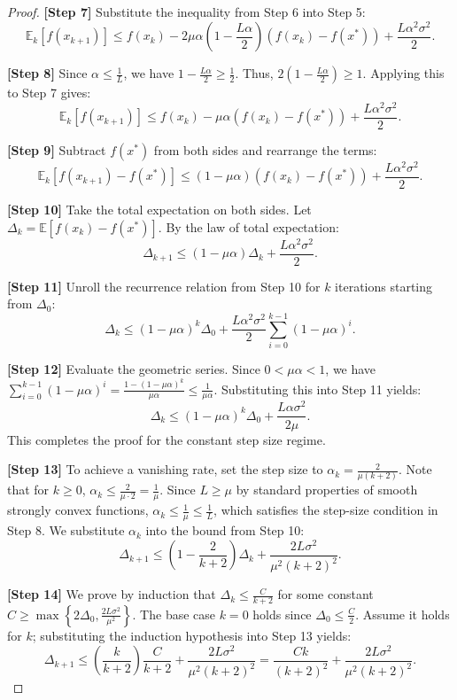 \documentclass[11pt]{article}
\begin{document}
\begin{proof}
\textbf{[Step 7]} Substitute the inequality from Step 6 into Step 5:
\[ \mathbb{E}_k[f(x_{k+1})] \le f(x_k) - 2 \mu \alpha \left( 1 - \frac{L \alpha}{2} \right) (f(x_k) - f(x^*)) + \frac{L \alpha^2 \sigma^2}{2}. \]

\textbf{[Step 8]} Since $\alpha \le \frac{1}{L}$, we have $1 - \frac{L \alpha}{2} \ge \frac{1}{2}$. Thus, $2 \left( 1 - \frac{L \alpha}{2} \right) \ge 1$. Applying this to Step 7 gives:
\[ \mathbb{E}_k[f(x_{k+1})] \le f(x_k) - \mu \alpha (f(x_k) - f(x^*)) + \frac{L \alpha^2 \sigma^2}{2}. \]

\textbf{[Step 9]} Subtract $f(x^*)$ from both sides and rearrange the terms:
\[ \mathbb{E}_k[f(x_{k+1}) - f(x^*)] \le (1 - \mu \alpha)(f(x_k) - f(x^*)) + \frac{L \alpha^2 \sigma^2}{2}. \]

\textbf{[Step 10]} Take the total expectation on both sides. Let $\Delta_k = \mathbb{E}[f(x_k) - f(x^*)]$. By the law of total expectation:
\[ \Delta_{k+1} \le (1 - \mu \alpha) \Delta_k + \frac{L \alpha^2 \sigma^2}{2}. \]

\textbf{[Step 11]} Unroll the recurrence relation from Step 10 for $k$ iterations starting from $\Delta_0$:
\[ \Delta_k \le (1 - \mu \alpha)^k \Delta_0 + \frac{L \alpha^2 \sigma^2}{2} \sum_{i=0}^{k-1} (1 - \mu \alpha)^i. \]

\textbf{[Step 12]} Evaluate the geometric series. Since $0 < \mu \alpha < 1$, we have $\sum_{i=0}^{k-1} (1 - \mu \alpha)^i = \frac{1 - (1 - \mu \alpha)^k}{\mu \alpha} \le \frac{1}{\mu \alpha}$. Substituting this into Step 11 yields:
\[ \Delta_k \le (1 - \mu \alpha)^k \Delta_0 + \frac{L \alpha \sigma^2}{2 \mu}. \]
This completes the proof for the constant step size regime.

\textbf{[Step 13]} To achieve a vanishing rate, set the step size to $\alpha_k = \frac{2}{\mu(k+2)}$. Note that for $k \ge 0$, $\alpha_k \le \frac{2}{\mu \cdot 2} = \frac{1}{\mu}$. Since $L \ge \mu$ by standard properties of smooth strongly convex functions, $\alpha_k \le \frac{1}{\mu} \le \frac{1}{L}$, which satisfies the step-size condition in Step 8. We substitute $\alpha_k$ into the bound from Step 10:
\[ \Delta_{k+1} \le \left(1 - \frac{2}{k+2}\right) \Delta_k + \frac{2 L \sigma^2}{\mu^2 (k+2)^2}. \]

\textbf{[Step 14]} We prove by induction that $\Delta_k \le \frac{C}{k+2}$ for some constant $C \ge \max\left\{2 \Delta_0, \frac{2 L \sigma^2}{\mu^2}\right\}$. The base case $k=0$ holds since $\Delta_0 \le \frac{C}{2}$. Assume it holds for $k$; substituting the induction hypothesis into Step 13 yields:
\[ \Delta_{k+1} \le \left(\frac{k}{k+2}\right) \frac{C}{k+2} + \frac{2 L \sigma^2}{\mu^2 (k+2)^2} = \frac{C k}{(k+2)^2} + \frac{2 L \sigma^2}{\mu^2 (k+2)^2}. \]


\end{proof}
\end{document}
